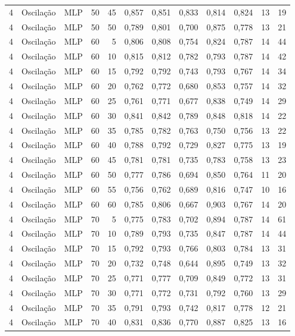 \begin{longtable}{@{}rllrrrrrrrrr@{}}
4 & Oscilação & MLP & 50 & 45 & 0,857 & 0,851 & 0,833 & 0,814 & 0,824 & 13 & 19 \\
4 & Oscilação & MLP & 50 & 50 & 0,789 & 0,801 & 0,700 & 0,875 & 0,778 & 13 & 21 \\
4 & Oscilação & MLP & 60 & 5 & 0,806 & 0,808 & 0,754 & 0,824 & 0,787 & 14 & 44 \\
4 & Oscilação & MLP & 60 & 10 & 0,815 & 0,812 & 0,782 & 0,793 & 0,787 & 14 & 42 \\
4 & Oscilação & MLP & 60 & 15 & 0,792 & 0,792 & 0,743 & 0,793 & 0,767 & 14 & 34 \\
4 & Oscilação & MLP & 60 & 20 & 0,762 & 0,772 & 0,680 & 0,853 & 0,757 & 14 & 32 \\
4 & Oscilação & MLP & 60 & 25 & 0,761 & 0,771 & 0,677 & 0,838 & 0,749 & 14 & 29 \\
4 & Oscilação & MLP & 60 & 30 & 0,841 & 0,842 & 0,789 & 0,848 & 0,818 & 14 & 22 \\
4 & Oscilação & MLP & 60 & 35 & 0,785 & 0,782 & 0,763 & 0,750 & 0,756 & 13 & 22 \\
4 & Oscilação & MLP & 60 & 40 & 0,788 & 0,792 & 0,729 & 0,827 & 0,775 & 13 & 19 \\
4 & Oscilação & MLP & 60 & 45 & 0,781 & 0,781 & 0,735 & 0,783 & 0,758 & 13 & 23 \\
4 & Oscilação & MLP & 60 & 50 & 0,777 & 0,786 & 0,694 & 0,850 & 0,764 & 11 & 20 \\
4 & Oscilação & MLP & 60 & 55 & 0,756 & 0,762 & 0,689 & 0,816 & 0,747 & 10 & 16 \\
4 & Oscilação & MLP & 60 & 60 & 0,785 & 0,806 & 0,667 & 0,903 & 0,767 & 14 & 20 \\
4 & Oscilação & MLP & 70 & 5 & 0,775 & 0,783 & 0,702 & 0,894 & 0,787 & 14 & 61 \\
4 & Oscilação & MLP & 70 & 10 & 0,789 & 0,793 & 0,735 & 0,847 & 0,787 & 14 & 44 \\
4 & Oscilação & MLP & 70 & 15 & 0,792 & 0,793 & 0,766 & 0,803 & 0,784 & 13 & 31 \\
4 & Oscilação & MLP & 70 & 20 & 0,732 & 0,748 & 0,644 & 0,895 & 0,749 & 13 & 32 \\
4 & Oscilação & MLP & 70 & 25 & 0,771 & 0,777 & 0,709 & 0,849 & 0,772 & 13 & 31 \\
4 & Oscilação & MLP & 70 & 30 & 0,771 & 0,772 & 0,731 & 0,792 & 0,760 & 13 & 29 \\
4 & Oscilação & MLP & 70 & 35 & 0,791 & 0,793 & 0,742 & 0,817 & 0,778 & 12 & 21 \\
4 & Oscilação & MLP & 70 & 40 & 0,831 & 0,836 & 0,770 & 0,887 & 0,825 & 13 & 16 \\

\end{longtable}

